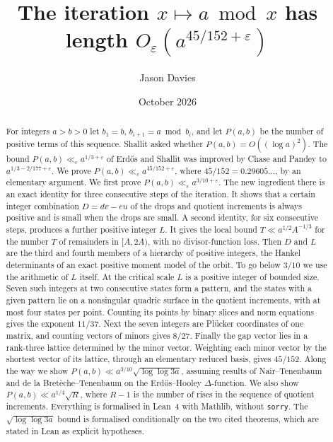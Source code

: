 \documentclass[11pt]{amsart}
\title[A discrete iteration related to Pierce expansions]{The iteration $x\mapsto a \bmod x$ has length $O_\varepsilon(a^{45/152+\varepsilon})$}
\author{Jason Davies}
\date{October 2026}
\theoremstyle{definition}
\theoremstyle{remark}
\newcommand{\lean}[1]{\texttt{#1}}
\begin{document}
\begin{abstract}
For integers $a>b>0$ let $b_1=b$, $b_{i+1}=a\bmod b_i$, and let $P(a,b)$ be the number of
positive terms of this sequence. Shallit asked whether $P(a,b)=O((\log a)^2)$. The bound
$P(a,b)\ll_\varepsilon a^{1/3+\varepsilon}$ of Erd\H{o}s and Shallit was improved by Chase and
Pandey to $a^{1/3-2/177+\varepsilon}$. We prove $P(a,b)\ll_\varepsilon a^{45/152+\varepsilon}$,
where $45/152=0.29605\ldots$, by an elementary argument. We first prove
$P(a,b)\ll_\varepsilon a^{3/10+\varepsilon}$. The new ingredient there is an exact identity for
three consecutive steps of the iteration. It shows that a certain integer combination
$D=dv-eu$ of the drops and quotient increments is always positive and is small when the drops
are small. A second identity, for six consecutive steps, produces a further positive integer
$L$. It gives the local bound $T\ll a^{1/2}A^{-1/3}$ for the number $T$ of remainders in
$[A,2A)$, with no divisor-function loss. Then $D$ and $L$ are the third and fourth members of a
hierarchy of positive integers, the Hankel determinants of an exact positive moment model of the
orbit. To go below $3/10$ we use the arithmetic of $L$ itself. At
the critical scale $L$ is a positive integer of bounded size. Seven such integers at two
consecutive states form a pattern, and the states with a given pattern lie on a nonsingular
quadric surface in the quotient increments, with at most four states per point. Counting its
points by binary slices and norm equations gives the exponent $11/37$. Next the seven integers
are Pl\"ucker coordinates of one matrix, and counting vectors of minors gives $8/27$. Finally
the gap vector lies in a rank-three lattice determined by the minor vector. Weighting each minor
vector by the shortest vector of its lattice, through an elementary reduced basis, gives
$45/152$. Along the way we show
$P(a,b)\ll a^{3/10}\sqrt{\log\log 3a}$, assuming results of Nair--Tenenbaum and de la
Bret\`eche--Tenenbaum on the Erd\H{o}s--Hooley $\Delta$-function. We also show
$P(a,b)\ll a^{1/4}\sqrt R$, where $R-1$ is the number of rises in the sequence of quotient
increments. Everything is formalised in Lean~4 with Mathlib, without \lean{sorry}. The
$\sqrt{\log\log 3a}$ bound is formalised conditionally on the two cited theorems, which are
stated in Lean as explicit hypotheses.
\end{abstract}

\maketitle
\enlargethispage{\baselineskip}
\end{document}
